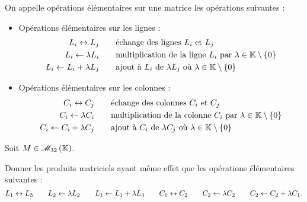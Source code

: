 \begin{defi}
On appelle opérations élémentaires sur une matrice les opérations suivantes :

\begin{itemize}
\item Opérations élémentaires sur les lignes : \[\begin{aligned}
L_i\leftrightarrow L_j &\qquad\text{échange des lignes }L_i\text{ et }L_j \\
L_i\gets\lambda L_i &\qquad\text{multiplication de la ligne }L_i\text{ par }\lambda\in\mathbb{K}\setminus\left\lbrace0\right\rbrace \\
L_i\gets L_i+\lambda L_j &\qquad\text{ajout à }L_i\text{ de }\lambda L_j\text{ où }\lambda\in\mathbb{K}\setminus\left\lbrace0\right\rbrace
\end{aligned}\]

\item Opérations élémentaires sur les colonnes : \[\begin{aligned}
C_i\leftrightarrow C_j &\qquad\text{échange des colonnes }C_i\text{ et }C_j \\
C_i\gets\lambda C_i &\qquad\text{multiplication de la colonne }C_i\text{ par }\lambda\in\mathbb{K}\setminus\left\lbrace0\right\rbrace \\
C_i\gets C_i+\lambda C_j &\qquad\text{ajout à }C_i\text{ de }\lambda C_j\text{ où }\lambda\in\mathbb{K}\setminus\left\lbrace0\right\rbrace
\end{aligned}\]
\end{itemize}
\end{defi}

\begin{exoex}
Soit \(M\in\M{32}\).

Donner les produits matriciels ayant même effet que les opérations élémentaires suivantes : \[L_1\leftrightarrow L_3\qquad L_2\gets\lambda L_2\qquad L_1\gets L_1+\lambda L_3\qquad C_1\leftrightarrow C_2\qquad C_2\gets\lambda C_2\qquad C_2\gets C_2+\lambda C_1.\]
\end{exoex}

